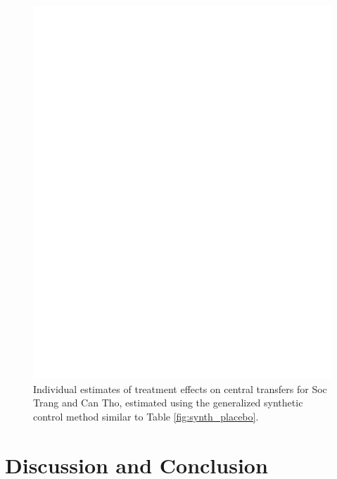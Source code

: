 \documentclass[12pt]{article}
\newcommand{\1}{\mathbbm{1}}
\begin{document}
\begin{figure}[!htbp]
	\centering
	\includegraphics[height=.75\textheight]{figure/190311_synth_results_2prov.png}
	\captionsetup{singlelinecheck=off}
	\caption[Individual synthetic control treatment effects]{Individual estimates of treatment effects on central transfers for Soc Trang and Can Tho, estimated using the generalized synthetic control method similar to Table \ref{fig:synth_placebo}.}
	\label{fig:synth_mech}
\end{figure}

\section{Discussion and Conclusion}
\label{sec:conclusion}
\end{document}
